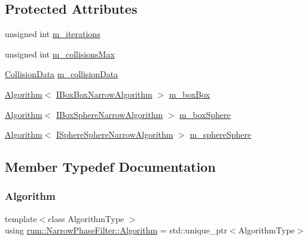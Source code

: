\subsection*{Protected Attributes}
\begin{DoxyCompactItemize}
\item 
unsigned int \mbox{\hyperlink{classrum_1_1_narrow_phase_filter_a2575cbc0c8ad20cdc396530dfa065dba}{m\+\_\+iterations}}
\item 
unsigned int \mbox{\hyperlink{classrum_1_1_narrow_phase_filter_a31fd0f5be9c5bdf070f0b3c659482457}{m\+\_\+collisions\+Max}}
\item 
\mbox{\hyperlink{classrum_1_1_collision_data}{Collision\+Data}} \mbox{\hyperlink{classrum_1_1_narrow_phase_filter_a1ff9f5bd13d32ce1613fd1168baf79bc}{m\+\_\+collision\+Data}}
\item 
\mbox{\hyperlink{classrum_1_1_narrow_phase_filter_a499acd63e16f164dbf1ee7567c1a3e0f}{Algorithm}}$<$ \mbox{\hyperlink{classrum_1_1_i_box_box_narrow_algorithm}{I\+Box\+Box\+Narrow\+Algorithm}} $>$ \mbox{\hyperlink{classrum_1_1_narrow_phase_filter_aa052144003d2e05ce1c7435f6bdbade5}{m\+\_\+box\+Box}}
\item 
\mbox{\hyperlink{classrum_1_1_narrow_phase_filter_a499acd63e16f164dbf1ee7567c1a3e0f}{Algorithm}}$<$ \mbox{\hyperlink{classrum_1_1_i_box_sphere_narrow_algorithm}{I\+Box\+Sphere\+Narrow\+Algorithm}} $>$ \mbox{\hyperlink{classrum_1_1_narrow_phase_filter_a1680a72ef5e04befbc12fa97e4a09114}{m\+\_\+box\+Sphere}}
\item 
\mbox{\hyperlink{classrum_1_1_narrow_phase_filter_a499acd63e16f164dbf1ee7567c1a3e0f}{Algorithm}}$<$ \mbox{\hyperlink{classrum_1_1_i_sphere_sphere_narrow_algorithm}{I\+Sphere\+Sphere\+Narrow\+Algorithm}} $>$ \mbox{\hyperlink{classrum_1_1_narrow_phase_filter_a4a6d0976218094e2618c246cc7f8b80f}{m\+\_\+sphere\+Sphere}}
\end{DoxyCompactItemize}


\subsection{Member Typedef Documentation}
\mbox{\label{classrum_1_1_narrow_phase_filter_a499acd63e16f164dbf1ee7567c1a3e0f}} 
\subsubsection{\texorpdfstring{Algorithm}{Algorithm}}
{\footnotesize\ttfamily template$<$class Algorithm\+Type $>$ \\
using \mbox{\hyperlink{classrum_1_1_narrow_phase_filter_a499acd63e16f164dbf1ee7567c1a3e0f}{rum\+::\+Narrow\+Phase\+Filter\+::\+Algorithm}} =  std\+::unique\+\_\+ptr$<$Algorithm\+Type$>$}



